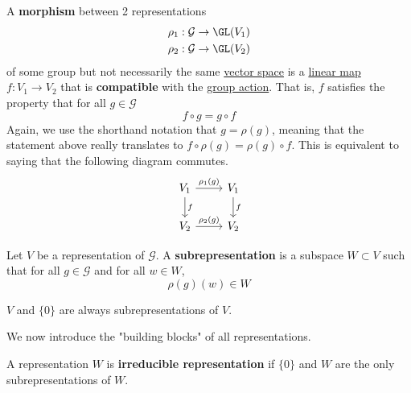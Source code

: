   \begin{definition}
    \label{def:morphism-of-representations}
    A \textbf{morphism} between 2 representations 
    \begin{align*}
      & \rho_1: \mathcal{G} \to \GL(V_1) \\
      & \rho_2: \mathcal{G} \to \GL(V_2) 
    \end{align*}
    of some group but not necessarily the same \hyperref[def:vector-space]{vector space} is a \hyperref[thm:linear-map]{linear map} $f: V_1 \to V_2$ that is \textbf{compatible} with the \hyperref[def:group-action]{group action}. That is, $f$ satisfies the property that for all $g \in \mathcal{G}$
    \begin{equation}
      f \circ g = g \circ f
    \end{equation}
    Again, we use the shorthand notation that $g = \rho(g)$, meaning that the statement above really translates to $ f \circ \rho(g) = \rho(g) \circ f$. This is equivalent to saying that the following diagram commutes. 
    \begin{equation}
      \begin{tikzcd}
          V_1 \arrow{r}{\rho_1(g)} \arrow{d}{f} & V_1 \arrow{d}{f} \\
          V_2 \arrow{r}{\rho_2 (g)} & V_2
          \end{tikzcd}
    \end{equation}
  \end{definition}

  \begin{definition}[Subrepresentation]
    \label{def:subrepresentation}
    Let $V$ be a representation of $\mathcal{G}$. A \textbf{subrepresentation} is a subspace $W \subset V$ such that for all $g \in \mathcal{G}$ and for all $w \in W$, 
    \begin{equation}
      \rho(g)(w) \in W
    \end{equation}
  \end{definition}

  \begin{example}
    \label{ex:trivial-subrepresentations}
    $V$ and $\{0\}$ are always subrepresentations of $V$. 
  \end{example}

  We now introduce the "building blocks" of all representations. 
  \begin{definition}
    \label{def:irreducible-representation}
    A representation $W$ is \textbf{irreducible representation} if $\{0\}$ and $W$ are the only subrepresentations of $W$. 
  \end{definition}

